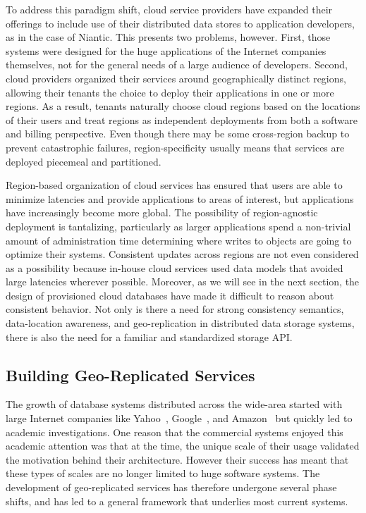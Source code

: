 To address this paradigm shift, cloud service providers have expanded their offerings to include use of their distributed data stores to application developers, as in the case of Niantic.
This presents two problems, however.
First, those systems were designed for the huge applications of the Internet companies themselves, not for the general needs of a large audience of developers.
Second, cloud providers organized their services around geographically distinct regions, allowing their tenants the choice to deploy their applications in one or more regions.
As a result, tenants naturally choose cloud regions based on the locations of their users and treat regions as independent deployments from both a software and billing perspective.
Even though there may be some cross-region backup to prevent catastrophic failures, region-specificity usually means that services are deployed piecemeal and partitioned.

Region-based organization of cloud services has ensured that users are able to minimize latencies and provide applications to areas of interest, but applications have increasingly become more global.
The possibility of region-agnostic deployment is tantalizing, particularly as larger applications spend a non-trivial amount of administration time determining where writes to objects are going to optimize their systems.
Consistent updates across regions are not even considered as a possibility because in-house cloud services used data models that avoided large latencies wherever possible.
Moreover, as we will see in the next section, the design of provisioned cloud databases have made it difficult to reason about consistent behavior.
Not only is there a need for strong consistency semantics, data-location awareness, and geo-replication in distributed data storage systems, there is also the need for a familiar and standardized storage API.

\subsection{Building Geo-Replicated Services}

The growth of database systems distributed across the wide-area started with large Internet companies like Yahoo~\cite{pnuts}, Google~\cite{bigtable}, and Amazon~\cite{dynamo} but quickly led to academic investigations.
One reason that the commercial systems enjoyed this academic attention was that at the time, the unique scale of their usage validated the motivation behind their architecture.
However their success has meant that these types of scales are no longer limited to huge software systems.
The development of geo-replicated services has therefore undergone several phase shifts, and has led to a general framework that underlies most current systems.

